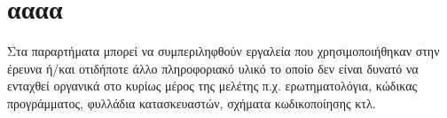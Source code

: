 
\chapter{αααα}

Στα παραρτήματα μπορεί να συμπεριληφθούν εργαλεία που χρησιμοποιήθηκαν στην έρευνα ή/και οτιδήποτε άλλο πληροφοριακό υλικό το οποίο δεν είναι δυνατό να ενταχθεί οργανικά στο κυρίως μέρος της μελέτης π.χ. ερωτηματολόγια, κώδικας προγράμματος, φυλλάδια κατασκευαστών, σχήματα κωδικοποίησης  κτλ.
